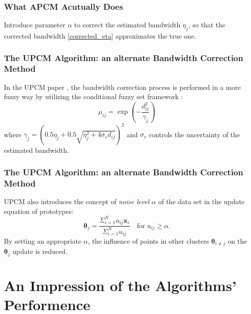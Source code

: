 \documentclass{beamer}
\begin{document}
\begin{frame}
  \frametitle{What APCM Acutually Does}
  Introduce parameter $\alpha$ to correct the estimated bandwidth
  $\eta_j$, so that the corrected bandwidth \eqref{corrected_eta}
  approximates the true one.
 
\end{frame}

\begin{frame}
  \frametitle{The UPCM Algorithm: an alternate Bandwidth Correction
    Method}
  In the UPCM paper \cite{hou_pcm_2016}, the bandwidth correction
  process is performed in a more fuzzy way by utilizing the
  conditional fuzzy set framework \cite{wang_new_2016}:
  \begin{equation}
    \label{upcm_u_update}
    \mu_{ij}=\exp\left(-\frac{d_{ij}^2}{\gamma_j}\right)
  \end{equation}
  where
  $\gamma_j=\left(0.5\eta_{j}+0.5\sqrt{\eta_{j}^{2}+4\sigma_vd_{ij}}\right)^2$
  and $\sigma_v$ controls the uncertainty of the estimated bandwidth.
\end{frame}


\begin{frame}
  \frametitle{The UPCM Algorithm: an alternate Bandwidth Correction
    Method}
  UPCM also introduces the concept of \emph{noise level} $\alpha$ of
  the data set in the update equation of prototypes:
  \begin{equation}
    \label{upcm_theta_update}
    \boldsymbol{\theta}_j=\frac{\Sigma_{i=1}^Nu_{ij}\mathbf{x}_i}{\Sigma_{i=1}^Nu_{ij}} \quad \text{for}\;u_{ij}\geq \alpha.
  \end{equation}
  By setting an appropriate $\alpha$, the influence of points in other
  clusters $\boldsymbol{\theta}_{i\neq j}$ on the
  $\boldsymbol{\theta}_j$ update is reduced.
\end{frame}

\section{An Impression of the Algorithms' Performence}
\end{document}
